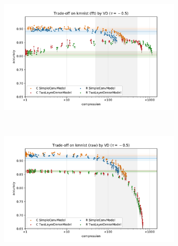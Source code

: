 \documentclass[a4paper,10pt]{article}
\begin{document}
\begin{figure}[!t]
  \centering
  \begin{subfigure}[b]{1.\textwidth}  %
    \centering
    \includegraphics[width=0.8\columnwidth]{figure__mnist-like__trade-off/legacy__VD__kmnist__fft__-0.5.pdf}
  \end{subfigure} \\%
  \begin{subfigure}[b]{1.\textwidth}  %
    \centering
    \includegraphics[width=0.8\columnwidth]{figure__mnist-like__trade-off/legacy__VD__kmnist__raw__-0.5.pdf}
  \end{subfigure} \\%
  \begin{subfigure}[b]{1.\textwidth}  %

\end{subfigure}
\end{figure}
\end{document}
